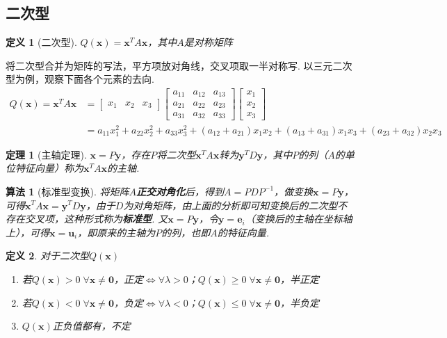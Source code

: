 \documentclass[11pt,UTF8]{ctexart}
\newtheorem{theorem}{定理}
\newtheorem{algorithm}{算法}
\newtheorem{definition}{定义}
\def\vx{\mathbf{x}}
\def\vy{\mathbf{y}}
\def\vu{\mathbf{u}}
\newcommand{\vb}[1]{\mathbf{#1}}
\begin{document}
\subsection{二次型}
\begin{definition}[二次型]
$Q(\vx)=\vx^TA\vx$，其中$A$是对称矩阵
\end{definition}
将二次型合并为矩阵的写法，平方项放对角线，交叉项取一半对称写. 以三元二次型为例，观察下面各个元素的去向.
\[\begin{aligned}Q(\vx)=\vx^TA\vx&=\begin{bmatrix}x_1&x_2&x_3\end{bmatrix}\begin{bmatrix}a_{11}&a_{12}&a_{13}\\a_{21}&a_{22}&a_{23}\\a_{31}&a_{32}&a_{33}\end{bmatrix}\begin{bmatrix}x_1\\x_2\\x_3\end{bmatrix}\\
&=a_{11}x_1^2+a_{22}x_2^2+a_{33}x_3^2+(a_{12}+a_{21})x_1x_2+(a_{13}+a_{31})x_1x_3+(a_{23}+a_{32})x_2x_3\end{aligned}\]
\begin{theorem}[主轴定理]
$\vx=P\vb{y}$，存在$P$将二次型$\vx^TA\vx$转为$\vb{y}^TD\vb{y}$，其中$P$的列（$A$的单位特征向量）称为$\vx^TA\vx$的主轴.
\end{theorem}
\begin{algorithm}[标准型变换]
将矩阵$A$\textbf{正交对角化}后，得到$A=PDP^{-1}$，做变换$\vx=P\vb{y}$，可得$\vx^TA\vx=\vb{y}^TD\vb{y}$，由于$D$为对角矩阵，由上面的分析即可知变换后的二次型不存在交叉项，这种形式称为\textbf{标准型}. 又$\vx=P\vy$，令$\vy=\vb{e}_i$（变换后的主轴在坐标轴上），可得$\vx=\vu_i$，即原来的主轴为$P$的列，也即$A$的特征向量.
\end{algorithm}
\begin{definition}
对于二次型$Q(\vx)$
\begin{enumerate}
	\itemsep -3pt
	\item 若$Q(\vx)>0\;\forall \vx\ne\vb{0}$，正定$\iff\forall\lambda>0$；$Q(\vx)\geq0\;\forall \vx\ne\vb{0}$，半正定
	\item 若$Q(\vx)<0\;\forall \vx\ne\vb{0}$，负定$\iff\forall\lambda<0$；$Q(\vx)\leq0\;\forall \vx\ne\vb{0}$，半负定
	\item $Q(\vx)$正负值都有，不定
\end{enumerate}
\end{definition}
\end{document}
